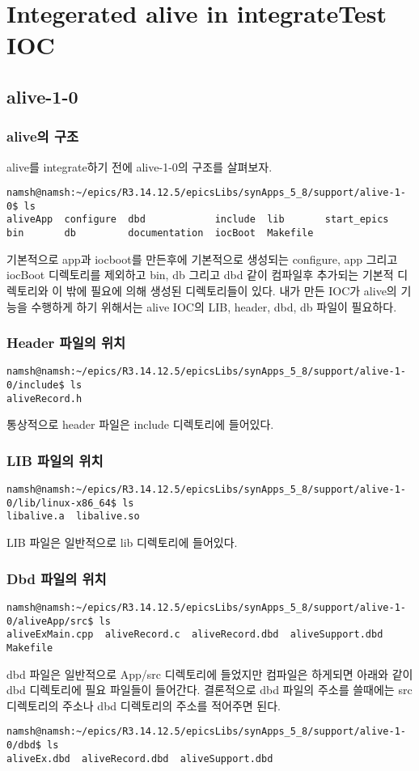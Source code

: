 \documentclass[11pt
  , a4paper
  , article
  , oneside
]{memoir}
\begin{document}
\chapter{Integerated alive in integrateTest IOC}
\section{alive-1-0}
\subsection{alive의 구조}
alive를 integrate하기 전에 alive-1-0의 구조를 살펴보자.
\begin{lstlisting}[style=termstyle]
namsh@namsh:~/epics/R3.14.12.5/epicsLibs/synApps_5_8/support/alive-1-0$ ls
aliveApp  configure  dbd            include  lib       start_epics
bin       db         documentation  iocBoot  Makefile
\end{lstlisting}
기본적으로 app과 iocboot를 만든후에 기본적으로 생성되는 configure, app 그리고 iocBoot 디렉토리를 제외하고 bin, db 그리고 dbd 같이 컴파일후 추가되는 기본적 디렉토리와 이 밖에 필요에 의해 생성된 디렉토리들이 있다.
내가 만든 IOC가 alive의 기능을 수행하게 하기 위해서는 alive IOC의 LIB, header, dbd, db 파일이 필요하다.
\subsection{Header 파일의 위치}
\begin{lstlisting}[style=termstyle]
namsh@namsh:~/epics/R3.14.12.5/epicsLibs/synApps_5_8/support/alive-1-0/include$ ls
aliveRecord.h
\end{lstlisting}
통상적으로 header 파일은 include 디렉토리에 들어있다.
\subsection{LIB 파일의 위치}
\begin{lstlisting}[style=termstyle]
namsh@namsh:~/epics/R3.14.12.5/epicsLibs/synApps_5_8/support/alive-1-0/lib/linux-x86_64$ ls
libalive.a  libalive.so
\end{lstlisting}
LIB 파일은 일반적으로 lib 디렉토리에 들어있다.
\subsection{Dbd 파일의 위치}
\begin{lstlisting}[style=termstyle]
namsh@namsh:~/epics/R3.14.12.5/epicsLibs/synApps_5_8/support/alive-1-0/aliveApp/src$ ls
aliveExMain.cpp  aliveRecord.c  aliveRecord.dbd  aliveSupport.dbd  Makefile
\end{lstlisting}
dbd 파일은 일반적으로 App/src 디렉토리에 들었지만 컴파일은 하게되면 아래와 같이 dbd 디렉토리에 필요 파일들이 들어간다. 결론적으로 dbd 파일의 주소를 쓸때에는 src 디렉토리의 주소나 dbd 디렉토리의 주소를 적어주면 된다.
\begin{lstlisting}[style=termstyle]
namsh@namsh:~/epics/R3.14.12.5/epicsLibs/synApps_5_8/support/alive-1-0/dbd$ ls
aliveEx.dbd  aliveRecord.dbd  aliveSupport.dbd
\end{lstlisting}
\end{document}
